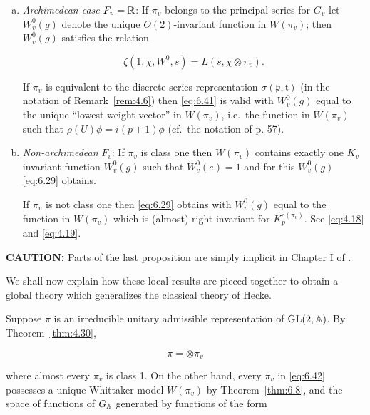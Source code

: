 \begin{proposition}\label{prop:6.17}

\begin{enumerate}[(a)]

\item \emph{Archimedean case} $F_v = \mathbb{R}$: If $\pi_v$ belongs to the principal series for $G_v$ let $W_v^0(g)$ denote the unique $O(2)$-invariant function in $W(\pi_v)$; then $W_v^0(g)$ satisfies the relation

\begin{equation}\label{eq:6.41}
\zeta(1, \chi, W^0, s) = L(s, \chi \otimes \pi_v).\tag{6.41}
\end{equation}

If $\pi_v$ is equivalent to the discrete series representation $\sigma(\mathfrak{p}, \mathfrak{t})$ (in the notation of Remark~\ref{rem:4.6}) then \eqref{eq:6.41} is valid with $W_v^0(g)$ equal to the unique ``lowest weight vector'' in $W(\pi_v)$, i.e.\ the function in $W(\pi_v)$ such that $\rho(U)\phi = i(p + 1)\phi$ (cf.\ the notation of p. 57).

\item \emph{Non-archimedean} $F_v$: If $\pi_v$ is class one then $W(\pi_v)$ contains exactly one $K_v$ invariant function $W_v^0(g)$ such that $W_v^0(e) = 1$ and for this $W_v^0(g)$ \eqref{eq:6.29} obtains.

If $\pi_v$ is not class one then \eqref{eq:6.29} obtains with $W_v^0(g)$ equal to the function in $W(\pi_v)$ which is (almost) right-invariant for $K_p^{c(\pi_v)}$. See \eqref{eq:4.18} and \eqref{eq:4.19}.

\end{enumerate}

\end{proposition}

\textbf{CAUTION:} Parts of the last proposition are simply implicit in Chapter I of \cite{JacquetLanglands}.

We shall now explain how these local results are pieced together to obtain a global theory which generalizes the classical theory of Hecke.

Suppose $\pi$ is an irreducible unitary admissible representation of $\operatorname{GL}(2, \mathbb{A})$. By Theorem~\ref{thm:4.30},

\[
\pi = \otimes \pi_v
\]

where almost every $\pi_v$ is class 1. On the other hand, every $\pi_v$ in \eqref{eq:6.42} possesses a unique Whittaker model $W(\pi_v)$ by Theorem~\ref{thm:6.8}, and the space of functions of $G_{\mathbb{A}}$ generated by functions of the form

